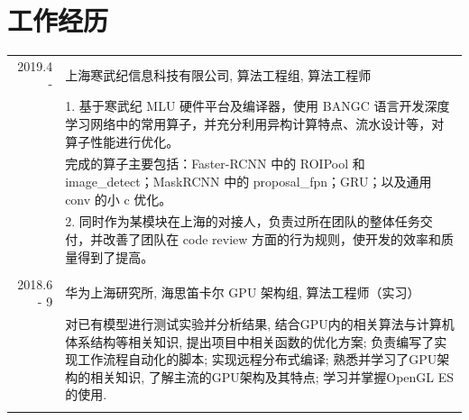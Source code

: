 \documentclass[a4paper,11pt]{article}
\begin{document}
\section{工作经历}
\begin{tabular}{r|p{11cm}}
 \textsc{2019.4 - } & 上海寒武纪信息科技有限公司, 算法工程组, 算法工程师 \\&\footnotesize{1. 基于寒武纪 MLU 硬件平台及编译器，使用 BANGC 语言开发深度学习网络中的常用算子，并充分利用异构计算特点、流水设计等，对算子性能进行优化。}\\&\footnotesize{完成的算子主要包括：Faster-RCNN 中的 ROIPool 和 image\_detect；MaskRCNN 中的 proposal\_fpn；GRU；以及通用 conv 的小 c 优化。}\\&\footnotesize{2. 同时作为某模块在上海的对接人，负责过所在团队的整体任务交付，并改善了团队在 code review 方面的行为规则，使开发的效率和质量得到了提高。}\\\multicolumn{2}{c}{} \\
 \textsc{2018.6 - 9} & 华为上海研究所, 海思笛卡尔 GPU 架构组, 算法工程师（实习） \\&\footnotesize{对已有模型进行测试实验并分析结果, 结合GPU内的相关算法与计算机体系结构等相关知识, 提出项目中相关函数的优化方案; 负责编写了实现工作流程自动化的脚本; 实现远程分布式编译; 熟悉并学习了GPU架构的相关知识, 了解主流的GPU架构及其特点; 学习并掌握OpenGL ES的使用.}\\\multicolumn{2}{c}{} \\
\end{tabular}
\end{document}
